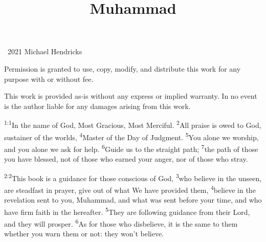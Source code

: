 \documentclass[openany,12pt,english]{book}
\title{Muhammad}
\author{}
\date{}
\newenvironment{para}{\par\pretolerance=100\tolerance=200\setlength{\emergencystretch}{0.6em}\relax}{\par}
\begin{document}
\maketitle

{
\thispagestyle{empty}
\vspace*{\fill}
\begin{changemargin}{.8in}{.8in}
\begin{center}
\textcopyright{}~2021 Michael Hendricks

\vspace{0.5\baselineskip}

Permission is granted to use, copy, modify, and distribute
this work for any purpose with or without fee.

\vspace{0.5\baselineskip}

This work is provided as-is without any express or implied
warranty. In no event is the author liable for any damages
arising from this work.
\end{center}
\end{changemargin}
}
\clearpage{}

\clearpage{}

\markboth{}{}


\begin{para}
    \textsuperscript{1:1}\thinspace{}In the name of God, Most Gra\-cious, Most Mer\-ci\-ful.
    \textsuperscript{2}\thinspace{}All praise is owed to God, sus\-tain\-er of the worlds,
    \textsuperscript{4}\thinspace{}Mas\-ter of the Day of Judg\-ment.
    \textsuperscript{5}\thinspace{}You a\-lone we wor\-ship, and you a\-lone we ask for help.
    \textsuperscript{6}\thinspace{}Guide us to the straight path;
    \textsuperscript{7}\thinspace{}the path of those you have bless\-ed, not of those who earned your an\-ger, nor of those who stray.
\end{para}

\bigskip{}

\begin{para}
    \textsuperscript{2:2}\thinspace{}This book is a guid\-ance for those con\-scious of God,
    \textsuperscript{3}\thinspace{}who be\-lieve in the un\-seen, are stead\-fast in pray\-er, give out of what We have pro\-vid\-ed them,
    \textsuperscript{4}\thinspace{}be\-lieve in the rev\-e\-la\-tion sent to you, Muhammad, and what was sent be\-fore your time, and who have firm faith in the here\-af\-ter.
    \textsuperscript{5}\thinspace{}They are fol\-low\-ing guid\-ance from their Lord, and they will pros\-per.
    \textsuperscript{6}\thinspace{}As for those who dis\-be\-lieve, it is the same to them wheth\-er you warn them or not: they won't be\-lieve.
\end{para}
\end{document}
